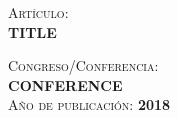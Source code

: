 
\newcommand{\congreso}[4]{
\cleardoublepage
\vspace*{10cm}
\textsc{Artículo}:\\[5pt]
\uppercase{\textbf{#1}}\\
\bigskip

\textsc{Congreso/Conferencia}:\\[5pt]
\uppercase{\textbf{#2}}\\

\textsc{Año de publicación}: \uppercase{\textbf{#3}}\\

\cleardoublepage


}

\congreso{Title}{Conference}{2018}{conference}
